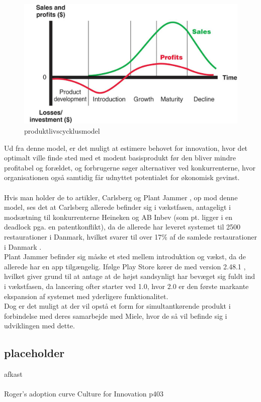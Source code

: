 \begin{figure}[H]
    \includegraphics[width=\textwidth]{assets/Product-Life-Cycle-Stages.jpg}
    \caption{produktlivscycklusmodel \cite{plcpic}}
    \label{livscyklusmodel}
\end{figure}
\noindent
Ud fra denne model, er det muligt at estimere behovet for innovation, hvor det optimalt ville finde sted med et modent basisprodukt før den bliver mindre profitabel og forældet,
og forbrugerne søger alternativer ved konkurrenterne, hvor organisationen også samtidig får udnyttet potentialet for økonomisk gevinst.
\\~\\Hvis man holder de to artikler, Carlsberg og Plant Jammer \cite[a.2, a.3]{eksamensopgave}, op mod denne model, ses det at Carlsberg allerede befinder sig i vækstfasen,
antageligt i modsætning til konkurrenterne Heineken og AB Inbev (som pt. ligger i en deadlock pga. en patentkonflikt), da de allerede har leveret systemet til 2500 restaurationer i Danmark, hvilket svarer til over 17\% af de samlede restaurationer i Danmark \cite{restaurantstat}.
\\Plant Jammer befinder sig måske et sted mellem introduktion og vækst, da de allerede har en app tilgængelig. Ifølge Play Store kører de med version 2.48.1 \cite{plantplay}, hvilket giver grund til at antage at de højst sandsynligt har bevæget sig fuldt ind i vækstfasen, da lancering ofter starter ved 1.0, hvor 2.0 er den første markante ekspansion af systemet med yderligere funktionalitet.
\\Dog er det muligt at der vil opstå et form for simultantkørende produkt i forbindelse med deres samarbejde med Miele, hvor de så vil befinde sig i udviklingen med dette.
\subsection{placeholder}
afkast
\\~\\Roger's adoption curve
Culture for Innovation p403
